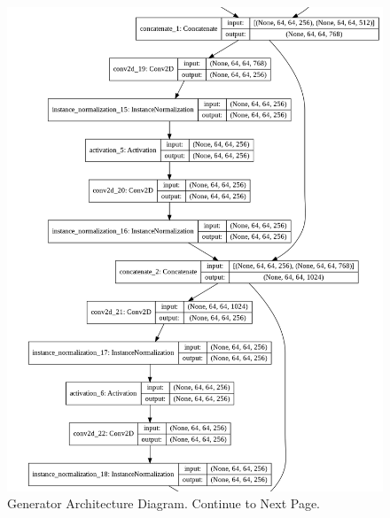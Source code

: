 \begin{figure}[H]
        \vspace*{3cm}
	    \begin{center} 
	    \includegraphics[scale=0.40]{images/generator_3.png}
	    \caption{Generator Architecture Diagram. Continue to Next Page.}
	    \end{center}
\end{figure}

